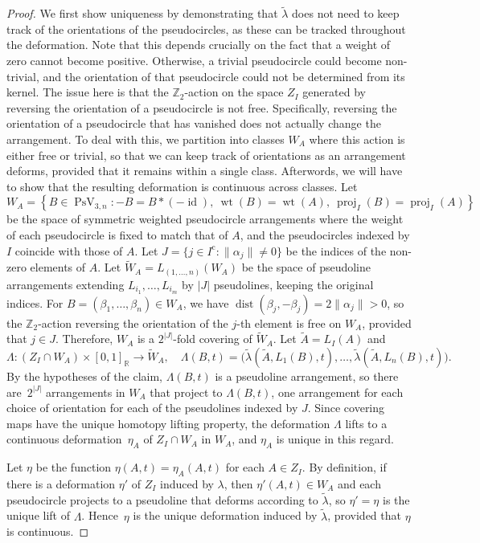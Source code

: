 \documentclass[JEP,XML,SOM,Unicode,NoFloatCountersInSection,published]{cedram}
\theoremstyle{remark}
\let\mb\mathbb
\newcommand{\compl}[1]{{{#1}^{\text{c}}}}
\DeclareMathOperator{\wei}{wt}
\DeclareMathOperator{\dist}{dist}
\DeclareMathOperator{\pstief}{PsV}
\DeclareMathOperator{\proj}{proj}
\DeclareMathOperator{\id}{id}
\begin{document}
\begin{proof}
We first show uniqueness by demonstrating that $\tilde \lambda$ does not need to keep track of the orientations of the pseudocircles, as these can be tracked throughout the deformation.
Note that this depends crucially on the fact that a weight of zero cannot become positive.
Otherwise, a trivial pseudocircle could become non-trivial, and the orientation of that pseudocircle could not be determined from its kernel. The issue here is that the $\mb{Z}_2$-action on the space $Z_I$ generated by reversing the orientation of a pseudocircle is not free. Specifically, reversing the orientation of a pseudocircle that has vanished does not actually change the arrangement. To deal with this, we partition into classes $W_A$ where this action is either free or trivial, so that we can keep track of orientations as an arrangement deforms, provided that it remains within a single class. Afterwords, we will have to show that the resulting deformation is continuous across classes.
Let
\[ W_A = \left\{B \in \pstief_{3,n}:-B = B*(-\id),\ \wei(B) = \wei(A),\ \proj_I(B) = \proj_I(A) \right\} \]
be the space of symmetric weighted pseudocircle arrangements where the weight of each pseudocircle is fixed to match that of $A$,
and the pseudocircles indexed by $I$ coincide with those of $A$.
Let ${J = \{j \in \compl{I}: \|\alpha_j\| \neq 0 \}}$ be the indices of the non-zero elements of $A$.
Let $\widetilde W_A = L_{(1,\dots,n)}(W_A)$
be the space of pseudoline arrangements extending $L_{i_1},\dots,L_{i_m}$ by $|J|$ pseudolines, keeping the original indices.
For $B = (\beta_1,\dots,\beta_n) \in W_A$, we have $\dist(\beta_j,- \beta_j) = 2\|\alpha_j\| >0$, so the $\mb{Z}_2$-action reversing the orientation of the $j$-th element is free on $W_A$, provided that $j \in J$.
Therefore, $W_A$ is a $2^{|J|}$-fold covering of $\widetilde W_A$.
Let $\tilde A = L_I(A)$ and
\[
\Lambda : (Z_I\cap W_A) \times [0,1]_\mb{R} \to \widetilde W_A, \quad
\Lambda(B,t) = \bigl( \tilde \lambda(\tilde A, L_1(B), t),\dots, \tilde \lambda(\tilde A, L_n(B),t) \bigr).
\]
By the hypotheses of the claim, $\Lambda(B,t)$ is a pseudoline arrangement, so there are~$2^{|J|}$ arrangements in $W_A$ that project to $\Lambda(B,t)$, one arrangement for each choice of orientation for each of the pseudolines indexed by $J$.
Since covering maps have the unique homotopy lifting property, the deformation $\Lambda$ lifts to a continuous deformation~$\eta_A$ of $Z_I \cap W_A$ in $W_A$, and $\eta_A$ is unique in this regard.

Let $\eta$ be the function $\eta(A,t) = \eta_A(A,t)$ for each $A \in Z_I$.
By definition, if there is a deformation $\eta'$ of $Z_I$ induced by $\lambda$, then $\eta'(A,t) \in W_A$ and each pseudocircle projects to a pseudoline that deforms according to $\tilde \lambda$, so $\eta' = \eta$ is the unique lift of $\Lambda$.
Hence~$\eta$ is the unique deformation induced by $\tilde \lambda$, provided that $\eta$ is continuous.


\end{proof}
\end{document}

